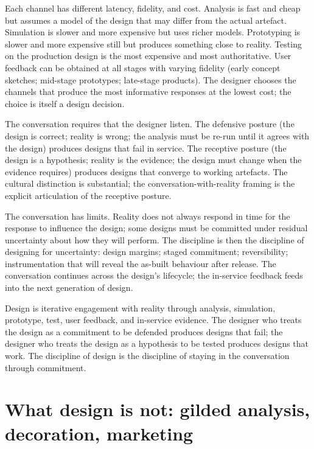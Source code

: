 Each channel has different latency, fidelity, and cost. Analysis is fast and cheap but assumes a model of the design that may differ from the actual artefact. Simulation is slower and more expensive but uses richer models. Prototyping is slower and more expensive still but produces something close to reality. Testing on the production design is the most expensive and most authoritative. User feedback can be obtained at all stages with varying fidelity (early concept sketches; mid-stage prototypes; late-stage products). The designer chooses the channels that produce the most informative responses at the lowest cost; the choice is itself a design decision.

The conversation requires that the designer listen. The defensive posture (the design is correct; reality is wrong; the analysis must be re-run until it agrees with the design) produces designs that fail in service. The receptive posture (the design is a hypothesis; reality is the evidence; the design must change when the evidence requires) produces designs that converge to working artefacts. The cultural distinction is substantial; the conversation-with-reality framing is the explicit articulation of the receptive posture.

The conversation has limits. Reality does not always respond in time for the response to influence the design; some designs must be committed under residual uncertainty about how they will perform. The discipline is then the discipline of designing for uncertainty: design margins; staged commitment; reversibility; instrumentation that will reveal the as-built behaviour after release. The conversation continues across the design's lifecycle; the in-service feedback feeds into the next generation of design.

\begin{principle}
Design is iterative engagement with reality through analysis, simulation, prototype, test, user feedback, and in-service evidence. The designer who treats the design as a commitment to be defended produces designs that fail; the designer who treats the design as a hypothesis to be tested produces designs that work. The discipline of design is the discipline of staying in the conversation through commitment.
\end{principle}

\section{What design is not: gilded analysis, decoration, marketing}

